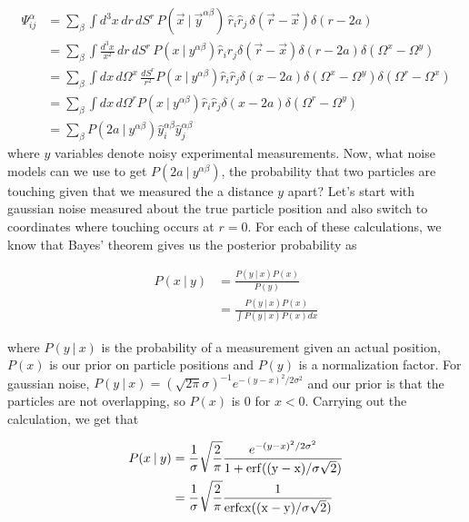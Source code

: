 \documentclass[twocolumn,amsmath,amssymb]{revtex4}
\newcommand\given[1][]{\:#1\vert\:}
\begin{document}
\begin{align}
    \Psi^{\alpha}_{ij} &= \sum_{\beta} \int d^3x\,dr\,dS^r\, P(\vec{x} \given \vec{y}^{\alpha\beta})\, \hat{r}_i \hat{r}_j\, \delta(\vec{r}-\vec{x})\delta(r-2a) \nonumber \\
                       &= \sum_{\beta} \int \frac{d^3x}{x^2}\, dr\,dS^r\, P(x \given y^{\alpha\beta}) \hat{r}_i \hat{r}_j \delta(\vec{r}-\vec{x}) \delta(r-2a)\delta(\Omega^x - \Omega^y) \nonumber \\
                       &= \sum_{\beta} \int dx\,d\Omega^x\, \frac{dS^r}{r^2} P(x\given y^{\alpha\beta}) \hat{r}_i \hat{r}_j \delta(x-2a) \delta(\Omega^x - \Omega^y) \delta(\Omega^r - \Omega^x) \nonumber \\
                       &= \sum_{\beta} \int dx\,d\Omega^r P(x\given y^{\alpha\beta}) \hat{r}_i \hat{r}_j \delta(x-2a) \delta(\Omega^r - \Omega^y) \nonumber \\
                       &= \sum_{\beta} P(2a \given y^{\alpha\beta}) \hat{y}^{\alpha\beta}_i \hat{y}^{\alpha\beta}_j \label{eq:noise_general}
\end{align}
where $y$ variables denote noisy experimental measurements.  Now, what noise
models can we use to get $P(2a \given y^{\alpha\beta})$, the probability that
two particles are touching given that we measured the a distance $y$ apart?
Let's start with gaussian noise measured about the true particle position and
also switch to coordinates where touching occurs at $r=0$.  For each of
these calculations, we know that Bayes' theorem gives us the posterior probability
as

\begin{align*}
    P(x \given y) &= \frac{P(y \given x) P(x)} {P(y)} \\
             &= \frac{P(y \given x) P(x) }{\int P(y \given x) P(x) dx}
\end{align*}

where $P(y\given x)$ is the probability of a measurement given an actual position,
$P(x)$ is our prior on particle positions and $P(y)$ is a normalization factor.
For gaussian noise, $P(y\given x) = (\sqrt{2\pi}\sigma)^{-1}e^{-(y-x)^2/2\sigma^2}$
and our prior is that the particles are not overlapping, so $P(x)$ is $0$ for
$x < 0$.  Carrying out the calculation, we get that

\begin{align}
    P(x \given y) &= \frac{1}{\sigma}\sqrt{\frac{2}{\pi}} \frac{e^{-(y-x)^2 / 2\sigma^2}}{1 + \rm{erf}((y-x)/\sigma\sqrt{2})} \label{eq:gaussian_noise} \\
             &= \frac{1}{\sigma}\sqrt{\frac{2}{\pi}} \frac{1}{\rm{erfcx}((x-y)/\sigma\sqrt{2})} \nonumber
\end{align}
\end{document}
